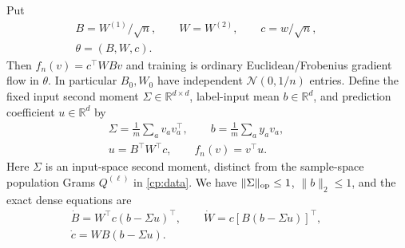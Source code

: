 Put
\begin{equation}\label{cp:nth:eq:normalization}{\begin{gathered}
B=W^{(1)}/\sqrt n,\qquad W=W^{(2)},\qquad c=w/\sqrt n,
\qquad\\ \theta=(B,W,c).
\end{gathered}}\end{equation} Then \(f_n(v)=c^\top WBv\) and training is
ordinary Euclidean/Frobenius gradient flow in \(\theta\). In particular
\(B_0,W_0\) have independent \(\mathcal N(0,1/n)\) entries. Define the
fixed input second moment \(\Sigma\in\mathbb R^{d\times d}\),
label-input mean \(b\in\mathbb R^d\), and prediction coefficient
\(u\in\mathbb R^d\) by
\begin{equation}\label{cp:nth:eq:data}{\begin{gathered}
\Sigma=\frac1m\sum_a v_av_a^\top,\qquad b=\frac1m\sum_a y_av_a,\qquad\\
u=B^\top W^\top c,\qquad f_n(v)=v^\top u.
\end{gathered}}\end{equation} Here \(\Sigma\) is an input-space second moment,
distinct from the sample-space population Grams \(Q^{(\ell)}\) in
\eqref{cp:data}. We have \(\|\Sigma\|_{\rm op}\le1\),
\(\|b\|_2\le1\), and the exact dense equations are
\begin{equation}\label{cp:nth:eq:dense}{\begin{gathered}
\dot B=W^\top c(b-\Sigma u)^\top,\qquad
\dot W=c[B(b-\Sigma u)]^\top,\qquad\\ \dot c=WB(b-\Sigma u).
\end{gathered}}\end{equation}

